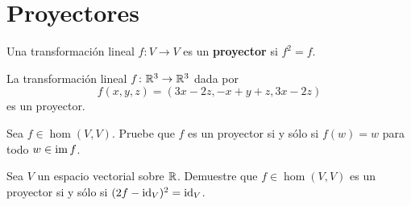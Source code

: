 %

\section{Proyectores}

\begin{block}
    Una transformación lineal $f\colon V\to V$ es un \textbf{proyector} si
    $f^2=f$. 
\end{block}

\begin{example}
	La transformación lineal $f\colon \mathbb{R}^3\to\mathbb{R}^3$ dada por
	\[
		f(x,y,z)=(3x-2z,-x+y+z,3x-2z)
	\]
	es un proyector.
\end{example}

\begin{xca}
	\label{xca:proyector}
    Sea $f\in\hom(V,V)$.  Pruebe que $f$ es un proyector si y sólo si $f(w)=w$
    para todo $w\in\operatorname{im} f$. 
\end{xca}

\begin{xca}
    \label{xca:proyector(2f-1)^2}
    Sea $V$ un espacio vectorial sobre $\mathbb{R}$. Demuestre que $f\in\hom(V,V)$ es
    un proyector si y sólo si $(2f-\operatorname{id}_V)^2=\operatorname{id}_V$. 
\end{xca}

